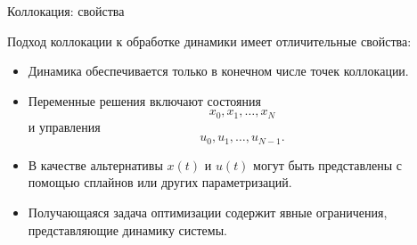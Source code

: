 \documentclass{beamer}
\begin{document}
	\begin{frame}{Коллокация: свойства}
		\begin{flushleft}
			Подход коллокации к обработке динамики имеет
			отличительные свойства:
			
			\vspace{0.5em}
			
			\begin{itemize}
				\item Динамика обеспечивается только в конечном числе
				точек коллокации.
				
				\vspace{0.5em}
				
				\item Переменные решения включают состояния
				\[
				x_0,x_1,\ldots,x_N
				\]
				и управления
				\[
				u_0,u_1,\ldots,u_{N-1}.
				\]
				
				\vspace{0.5em}
				
				\item В качестве альтернативы $x(t)$ и $u(t)$ могут быть представлены
				с помощью сплайнов или других параметризаций.
				
				\vspace{0.5em}
				
				\item Получающаяся задача оптимизации содержит
				явные ограничения, представляющие динамику системы.
			\end{itemize}
		\end{flushleft}
	\end{frame}
	
\end{document}
